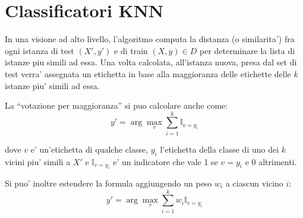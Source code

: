 \section{Classificatori KNN}

  In una visione ad alto livello, l'algoritmo computa la distanza (o similarita') fra ogni istanza di test $(X', y')$ e di train $(X, y) \in D$ per determinare la lista di istanze piu simili ad essa. Una volta calcolata, all'istanza nuova, presa dal set di test verra' assegnata un etichetta in base alla maggioranza delle etichette delle $k$ istanze piu' simili ad essa.

  La ``votazione per maggioranza'' si puo calcolare anche come:
  $$ y' = \arg\max_{v} \sum_{i=1}^k \mathbb{I}_{v = y_i} $$

  dove $v$ e' un'etichetta di qualche classe, $y_i$ l'etichetta della classe di uno dei $k$ vicini piu' simili a $X'$ e $\mathbb{I}_{v = y_i}$ e' un indicatore che vale 1 se $v = y_i$ e 0 altrimenti.

  Si puo' inoltre estendere la formula aggiungendo un peso $w_i$ a ciascun vicino $i$:
  $$ y' = \arg\max_{v} \sum_{i=1}^k w_i \mathbb{I}_{v = y_i} $$

